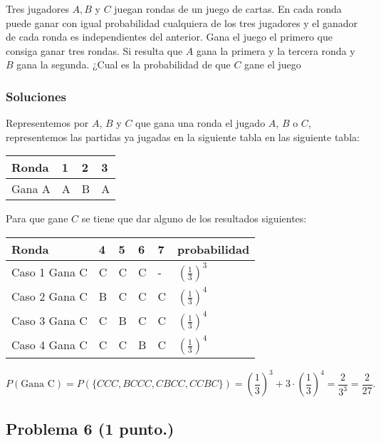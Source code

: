 \documentclass[
]{article}
\begin{document}
Tres jugadores \(A,B\) y \(C\) juegan rondas de un juego de cartas. En
cada ronda puede ganar con igual probabilidad cualquiera de los tres
jugadores y el ganador de cada ronda es independientes del anterior.
Gana el juego el primero que consiga ganar tres rondas. Si resulta que
\(A\) gana la primera y la tercera ronda y \(B\) gana la segunda. ¿Cual
es la probabilidad de que \(C\) gane el juego

\hypertarget{soluciones}{%
\subsubsection{Soluciones}\label{soluciones}}

Representemos por \(A\), \(B\) y \(C\) que gana una ronda el jugado
\(A\), \(B\) o \(C\), representemos las partidas ya jugadas en la
siguiente tabla en las siguiente tabla:

\begin{tabular}{|l||l|l|l|}
\hline
Ronda & 1 & 2 & 3\\\hline\hline
Gana A & A & B & A\\ \hline
\end{tabular}

Para que gane \(C\) se tiene que dar alguno de los resultados
siguientes:

\begin{table*}
\centering
\begin{tabular}{|l||l|l|l|l|l|}
\hline
Ronda & 4 & 5 & 6 & 7 & probabilidad \\\hline\hline
Caso 1 Gana C & C & C & C & -  & $\left(\frac{1}{3}\right)^3$\\ \hline
Caso 2 Gana C & B & C & C & C  & $\left(\frac{1}{3}\right)^4$\\ \hline
Caso 3 Gana C & C & B & C & C  & $\left(\frac{1}{3}\right)^4$\\ \hline
Caso 4 Gana C & C & C & B & C  & $\left(\frac{1}{3}\right)^4$\\ \hline
\end{tabular}
\end{table*}

\[P(\mbox{Gana C})= P(\{CCC,BCCC,CBCC,CCBC\})=
\left(\frac{1}{3}\right)^3 + 3\cdot \left(\frac{1}{3}\right)^4=\frac{2}{3^3}=\frac{2}{27}.\]

\hypertarget{problema-6}{%
\subsection{\texorpdfstring{Problema 6
(\textbf{1 punto.})}{Problema 6 ()}}\label{problema-6}}
\end{document}
